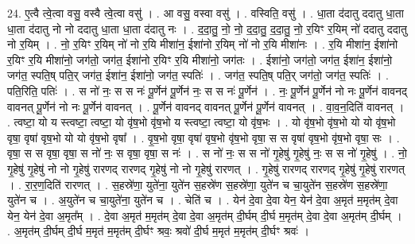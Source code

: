 \documentclass[17pt]{extarticle}
\begin{document}
24. ए॒त्वै त्वे॒त्वा वसु॒ वस्वै त्वे॒त्वा वसु॑ । . आ वसु॒ वस्वा वसु॑ । . वस्विति॒ वसु॑ । . धा॒ता द॑दातु ददातु धा॒ता धा॒ता द॑दातु नो नो ददातु धा॒ता धा॒ता द॑दातु नः । . द॒दा॒तु॒ नो॒ नो॒ द॒दा॒तु॒ द॒दा॒तु॒ नो॒ र॒यिꣳ र॒यिम् नो॑ ददातु ददातु नो र॒यिम् । . नो॒ र॒यिꣳ र॒यिम् नो॑ नो र॒यि मीशा॑न॒ ईशा॑नो र॒यिम् नो॑ नो र॒यि मीशा॑नः । . र॒यि मीशा॑न॒ ईशा॑नो र॒यिꣳ र॒यि मीशा॑नो॒ जग॑तो॒ जग॑त॒ ईशा॑नो र॒यिꣳ र॒यि मीशा॑नो॒ जग॑तः । . ईशा॑नो॒ जग॑तो॒ जग॑त॒ ईशा॑न॒ ईशा॑नो॒ जग॑त॒ स्पति॒ष् पति॒र् जग॑त॒ ईशा॑न॒ ईशा॑नो॒ जग॑त॒ स्पतिः॑ । . जग॑त॒ स्पति॒ष् पति॒र् जग॑तो॒ जग॑त॒ स्पतिः॑ । . पति॒रिति॒ पतिः॑ । . स नो॑ नः॒ स स नः॑ पू॒र्णेन॑ पू॒र्णेन॑ नः॒ स स नः॑ पू॒र्णेन॑ । . नः॒ पू॒र्णेन॑ पू॒र्णेन॑ नो नः पू॒र्णेन॑ वावनद् वावनत् पू॒र्णेन॑ नो नः पू॒र्णेन॑ वावनत् । . पू॒र्णेन॑ वावनद् वावनत् पू॒र्णेन॑ पू॒र्णेन॑ वावनत् । . वा॒व॒न॒दिति॑ वावनत् । . त्वष्टा॒ यो य स्त्वष्टा॒ त्वष्टा॒ यो वृ॑ष॒भो वृ॑ष॒भो य स्त्वष्टा॒ त्वष्टा॒ यो वृ॑ष॒भः । . यो वृ॑ष॒भो वृ॑ष॒भो यो यो वृ॑ष॒भो वृषा॒ वृषा॑ वृष॒भो यो यो वृ॑ष॒भो वृषा᳚ । . वृ॒ष॒भो वृषा॒ वृषा॑ वृष॒भो वृ॑ष॒भो वृषा॒ स स वृषा॑ वृष॒भो वृ॑ष॒भो वृषा॒ सः । . वृषा॒ स स वृषा॒ वृषा॒ स नो॑ नः॒ स वृषा॒ वृषा॒ स नः॑ । . स नो॑ नः॒ स स नो॑ गृ॒हेषु॑ गृ॒हेषु॑ नः॒ स स नो॑ गृ॒हेषु॑ । . नो॒ गृ॒हेषु॑ गृ॒हेषु॑ नो नो गृ॒हेषु॑ रारणद् रारणद् गृ॒हेषु॑ नो नो गृ॒हेषु॑ रारणत् । . गृ॒हेषु॑ रारणद् रारणद् गृ॒हेषु॑ गृ॒हेषु॑ रारणत् । . रा॒र॒ण॒दिति॑ रारणत् । . स॒हस्रे॑णा॒ युते॑ना॒ युते॑न स॒हस्रे॑ण स॒हस्रे॑णा॒ युते॑न च चा॒युते॑न स॒हस्रे॑ण स॒हस्रे॑णा॒ युते॑न च । . अ॒युते॑न च चा॒युते॑ना॒ युते॑न च । . चेति॑ च । . येन॑ दे॒वा दे॒वा येन॒ येन॑ दे॒वा अ॒मृत॑ म॒मृत॑म् दे॒वा येन॒ येन॑ दे॒वा अ॒मृत᳚म् । . दे॒वा अ॒मृत॑ म॒मृत॑म् दे॒वा दे॒वा अ॒मृत॑म् दी॒र्घम् दी॒र्घ म॒मृत॑म् दे॒वा दे॒वा अ॒मृत॑म् दी॒र्घम् । . अ॒मृत॑म् दी॒र्घम् दी॒र्घ म॒मृत॑ म॒मृत॑म् दी॒र्घꣳ श्रवः॒ श्रवो॑ दी॒र्घ म॒मृत॑ म॒मृत॑म् दी॒र्घꣳ श्रवः॑ । \newline
\pagebreak
{}
\end{document}
